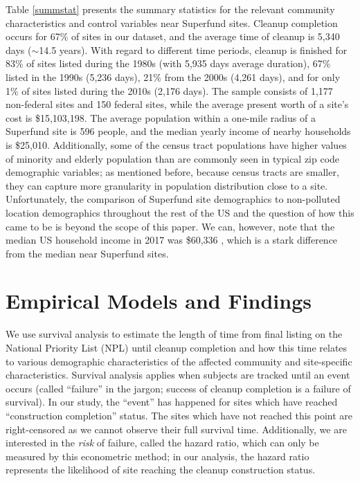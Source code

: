 \documentclass[12pt]{article}
\begin{document}
Table \ref{summstat} presents the summary statistics for the relevant community characteristics and control variables near Superfund sites. 
Cleanup completion occurs for 67\% of sites in our dataset, and the average time of cleanup is 5,340 days ($\sim$14.5 years). With regard to different time periods, cleanup is finished for 83\% of sites listed during the 1980s (with 5,935 days average duration), 67\%  listed in the 1990s (5,236 days), 21\% from the 2000s (4,261 days), and for only 1\% of sites listed during the 2010s (2,176 days). 
The sample consists of 1,177 non-federal sites and 150 federal sites, 
while the average present worth of a site's cost is \$15,103,198. 
The average population within a one-mile radius of a Superfund site is 596 people, and the median yearly income of nearby households is \$25,010. 
Additionally, some of the census tract populations have higher values of minority and elderly population than are commonly seen in typical zip code demographic variables; as mentioned before, because census tracts are smaller, they can capture more granularity in population distribution close to a site. Unfortunately, the comparison of Superfund site demographics to non-polluted location demographics throughout the rest of the US and the question of how this came to be is beyond the scope of this paper. We can, however, note that the median US household income in 2017 was \$60,336 \parencite{Guzman2018a}, which is a stark difference from the median near Superfund sites. 



\section{Empirical Models and Findings}\label{metrics}

We use survival analysis to estimate the length of time from final listing on the National Priority List (NPL) until cleanup completion and how this time relates to various demographic characteristics of the affected community and site-specific characteristics.  
\newcommand{\comm}{\mathrm{CommunityChars}_i}
Survival analysis applies when subjects are tracked until an event occurs (called ``failure'' in the jargon; success of cleanup completion is a failure of survival). In our study, the ``event'' has happened for sites which have reached ``construction completion'' status. The sites which have not reached this point are right-censored as we cannot observe their full survival time. Additionally, we are interested in the {\it risk} of failure, called the hazard ratio, which can only be measured by this econometric method; in our analysis, the hazard ratio represents the likelihood of site reaching the cleanup construction status. 
\end{document}
